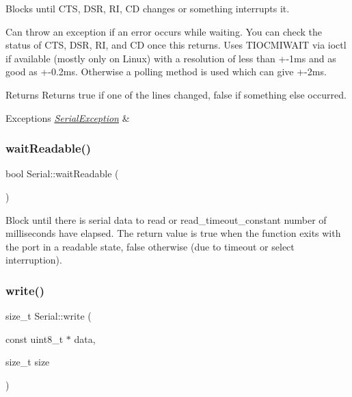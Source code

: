 Blocks until C\+TS, D\+SR, RI, CD changes or something interrupts it.

Can throw an exception if an error occurs while waiting. You can check the status of C\+TS, D\+SR, RI, and CD once this returns. Uses T\+I\+O\+C\+M\+I\+W\+A\+IT via ioctl if available (mostly only on Linux) with a resolution of less than +-\/1ms and as good as +-\/0.2ms. Otherwise a polling method is used which can give +-\/2ms.

\begin{DoxyReturn}{Returns}
Returns true if one of the lines changed, false if something else occurred.
\end{DoxyReturn}

\begin{DoxyExceptions}{Exceptions}
{\em \mbox{\hyperlink{classserial_1_1_serial_exception}{Serial\+Exception}}} & \\
\hline
\end{DoxyExceptions}
\mbox{\label{classserial_1_1_serial_ad6e395bfe91718b66f6695c10ee90e5b}} 
\subsubsection{\texorpdfstring{wait\+Readable()}{waitReadable()}}
{\footnotesize\ttfamily bool Serial\+::wait\+Readable (\begin{DoxyParamCaption}{ }\end{DoxyParamCaption})}

Block until there is serial data to read or read\+\_\+timeout\+\_\+constant number of milliseconds have elapsed. The return value is true when the function exits with the port in a readable state, false otherwise (due to timeout or select interruption). \mbox{\label{classserial_1_1_serial_aa020880cdff3a370ddc574f594379c3c}} 
\subsubsection{\texorpdfstring{write()}{write()}\hspace{0.1cm}{\footnotesize\ttfamily [1/3]}}
{\footnotesize\ttfamily size\+\_\+t Serial\+::write (\begin{DoxyParamCaption}\item[{const uint8\+\_\+t $\ast$}]{data,  }\item[{size\+\_\+t}]{size }\end{DoxyParamCaption})}

